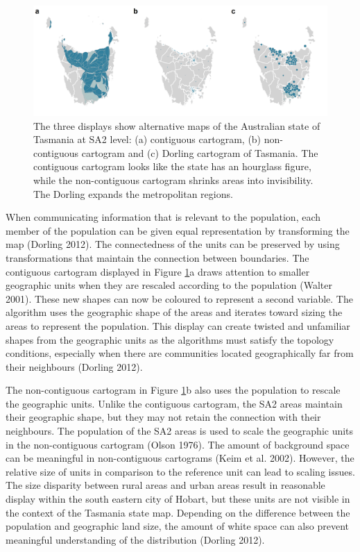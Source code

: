\begin{figure}
\includegraphics[width=1\linewidth]{kobakian-cook_files/figure-latex/tasdisplays-1} \caption{The three displays show alternative maps of the Australian state of Tasmania at SA2 level: (a) contiguous cartogram, (b) non-contiguous cartogram and (c) Dorling cartogram of Tasmania. The contiguous cartogram looks like the state has an hourglass figure, while the non-contiguous cartogram shrinks areas into invisibility. The Dorling expands the metropolitan regions.}\label{fig:tasdisplays}
\end{figure}

When communicating information that is relevant to the population, each member of the population can be given equal representation by transforming the map (Dorling 2012). The connectedness of the units can be preserved by using transformations that maintain the connection between boundaries. The contiguous cartogram displayed in Figure \ref{fig:tasdisplays}a draws attention to smaller geographic units when they are rescaled according to the population (Walter 2001). These new shapes can now be coloured to represent a second variable. The algorithm uses the geographic shape of the areas and iterates toward sizing the areas to represent the population. This display can create twisted and unfamiliar shapes from the geographic units as the algorithms must satisfy the topology conditions, especially when there are communities located geographically far from their neighbours (Dorling 2012).

The non-contiguous cartogram in Figure \ref{fig:tasdisplays}b also uses the population to rescale the geographic units. Unlike the contiguous cartogram, the SA2 areas maintain their geographic shape, but they may not retain the connection with their neighbours. The population of the SA2 areas is used to scale the geographic units in the non-contiguous cartogram (Olson 1976). The amount of background space can be meaningful in non-contiguous cartograms (Keim et al. 2002). However, the relative size of units in comparison to the reference unit can lead to scaling issues. The size disparity between rural areas and urban areas result in reasonable display within the south eastern city of Hobart, but these units are not visible in the context of the Tasmania state map. Depending on the difference between the population and geographic land size, the amount of white space can also prevent meaningful understanding of the distribution (Dorling 2012).


